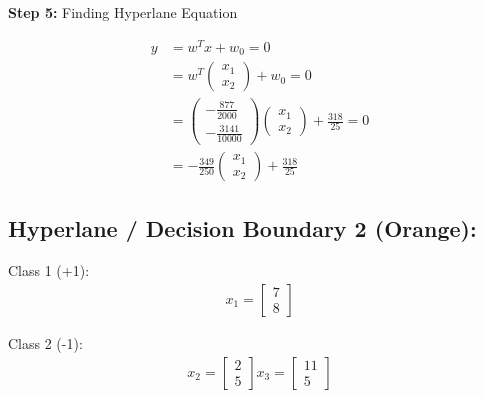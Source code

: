 \documentclass[12pt]{report}
\begin{document}
\vspace{20pt}

\textbf{Step 5:} Finding Hyperlane Equation

\begin{equation}
	\begin{aligned}
		y & = w^Tx + w_{0} = 0                                                                                                                      \\
		  & = w^T\begin{pmatrix}x_{1}              \\x_{2}\end{pmatrix} + w_{0} = 0                                                                 \\
		  & = \begin{pmatrix}-\frac{877}{2000}     \\ -\frac{3141}{10000}\end{pmatrix}\begin{pmatrix}x_{1}\\x_{2}\end{pmatrix} + \frac{318}{25} = 0 \\
		  & = -\frac{349}{250}\begin{pmatrix}x_{1} \\x_{2}\end{pmatrix} + \frac{318}{25}
	\end{aligned}
\end{equation}


\vspace{20pt}

\pagebreak
\subsection{Hyperlane / Decision Boundary 2 (Orange):}
Class 1 (+1):
\begin{equation*}
	\begin{aligned}
		x_{1} = \begin{bmatrix}
			        7 \\
			        8
		        \end{bmatrix}
	\end{aligned}
\end{equation*}

Class 2 (-1):
\begin{equation*}
	\begin{aligned}
		x_{2} = \begin{bmatrix}
			        2 \\
			        5
		        \end{bmatrix}
		x_{3} = \begin{bmatrix}
			        11 \\
			        5
		        \end{bmatrix}
	\end{aligned}
\end{equation*}
\end{document}
